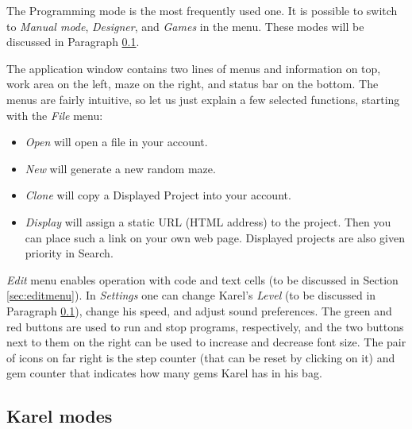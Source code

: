 \documentclass[article,A4,12pt]{llncs}
\begin{document}
\noindent
The Programming mode is the most frequently used one. It is possible to 
switch to {\em Manual mode}, {\em Designer}, and {\em Games} in the menu. 
These modes will be discussed in Paragraph \ref{levels}.
\newpage

\noindent
The application window contains two lines of menus and information on top,
work area on the left, maze on the right, and status bar on the bottom.
The menus are fairly intuitive, so let us just explain a few selected 
functions, starting with the {\em File} menu:

\begin{itemize}
\item {\em Open} will open a file in your account.
\item {\em New} will generate a new random maze.
\item {\em Clone} will copy a Displayed Project into your account. 
\item {\em Display} will assign a static URL (HTML address) to the project. Then you can 
      place such a link on your own web page. Displayed projects are also given priority in 
      Search.
\end{itemize}
{\em Edit} menu enables operation with code and text cells (to be discussed in 
Section \ref{sec:editmenu}). In {\em Settings} one can change Karel's {\em Level} (to be discussed
in Paragraph \ref{levels}), change his speed, and adjust sound preferences. The green and red 
buttons are used to run and stop programs, respectively, and the two buttons next to them on
the right can be used to increase and decrease font size. The pair of icons on far right is the 
step counter (that can be reset by clicking on it) and gem counter that indicates how many gems 
Karel has in his bag.

\subsection{Karel modes} \label{levels}
\end{document}
